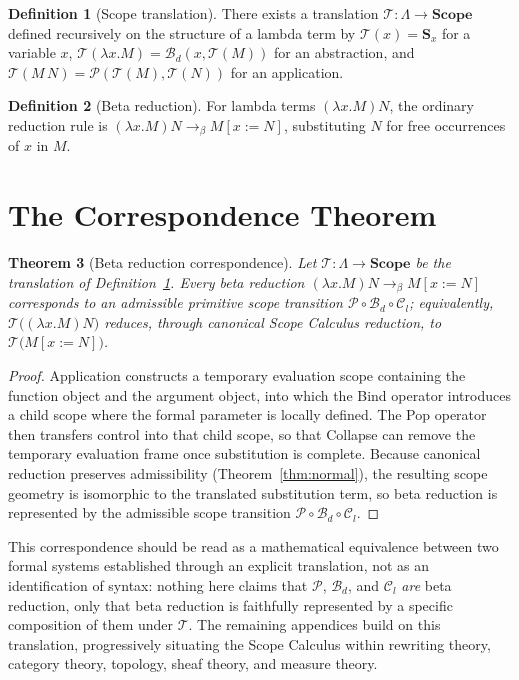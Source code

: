 \documentclass[11pt,twoside,openright]{book}
\numberwithin{equation}{chapter}
\theoremstyle{definition}
\newtheorem{definition}{Definition}[chapter]
\theoremstyle{plain}
\newtheorem{theorem}[definition]{Theorem}
\theoremstyle{remark}
\theoremstyle{definition}
\newcommand{\CatScope}{\mathbf{Scope}}
\newcommand{\Scope}{\mathbf{S}}
\newcommand{\Pop}{\mathcal{P}}
\newcommand{\Bind}{\mathcal{B}_d}
\newcommand{\Collapse}{\mathcal{C}_l}
\begin{document}
\begin{definition}[Scope translation]
\label{def:app-translation}
There exists a translation $\mathcal{T}:\Lambda\to\CatScope$ defined
recursively on the structure of a lambda term by
$\mathcal{T}(x)=\Scope_x$ for a variable $x$,
$\mathcal{T}(\lambda x.M)=\Bind(x,\mathcal{T}(M))$ for an abstraction, and
$\mathcal{T}(M\,N)=\Pop(\mathcal{T}(M),\mathcal{T}(N))$ for an application.
\end{definition}

\begin{definition}[Beta reduction]
For lambda terms $(\lambda x.M)N$, the ordinary reduction rule is
$(\lambda x.M)N\to_\beta M[x:=N]$, substituting $N$ for free occurrences
of $x$ in $M$.
\end{definition}

\section{The Correspondence Theorem}

\begin{theorem}[Beta reduction correspondence]
\label{thm:app-beta}
Let $\mathcal{T}:\Lambda\to\CatScope$ be the translation of
Definition~\ref{def:app-translation}. Every beta reduction
$(\lambda x.M)N\to_\beta M[x:=N]$ corresponds to an admissible primitive
scope transition $\Pop\circ\Bind\circ\Collapse$; equivalently,
$\mathcal{T}\big((\lambda x.M)N\big)$ reduces, through canonical Scope
Calculus reduction, to $\mathcal{T}\big(M[x:=N]\big)$.
\end{theorem}

\begin{proof}
Application constructs a temporary evaluation scope containing the
function object and the argument object, into which the Bind operator
introduces a child scope where the formal parameter is locally defined.
The Pop operator then transfers control into that child scope, so that
Collapse can remove the temporary evaluation frame once substitution is
complete. Because canonical reduction preserves admissibility
(Theorem~\ref{thm:normal}), the resulting scope geometry is isomorphic to
the translated substitution term, so beta reduction is represented by the
admissible scope transition $\Pop\circ\Bind\circ\Collapse$.
\end{proof}

This correspondence should be read as a mathematical equivalence between
two formal systems established through an explicit translation, not as
an identification of syntax: nothing here claims that $\Pop$, $\Bind$,
and $\Collapse$ \emph{are} beta reduction, only that beta reduction is
faithfully represented by a specific composition of them under
$\mathcal{T}$. The remaining appendices build on this translation,
progressively situating the Scope Calculus within rewriting theory,
category theory, topology, sheaf theory, and measure theory.
\end{document}

